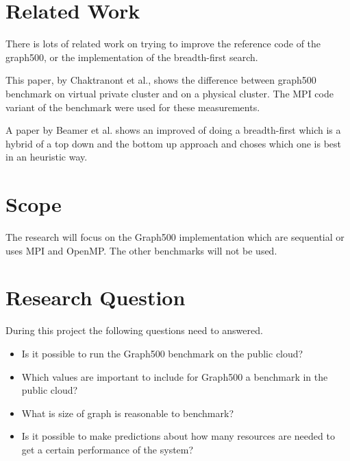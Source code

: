 \documentclass[A4]{scrartcl}
\begin{document}



\section*{Related Work}
There is lots of related work on trying to improve the reference code of the graph500, or the implementation of the breadth-first search. 

This paper, by Chaktranont et al.\cite{chakthranont2014exploring}, shows the difference between graph500 benchmark on virtual private cluster and on a physical cluster. The MPI code variant of the benchmark were used for these measurements.

A paper by Beamer et al.\cite{beamer2011searching} shows an improved of doing a breadth-first which is a hybrid of a top down and the bottom up approach and choses which one is best in an heuristic way. 



\section*{Scope}
The research will focus on the Graph500 implementation which are sequential or uses MPI and OpenMP. The other benchmarks will not be used. 

\section*{Research Question}
During this project the following questions need to answered.
\begin{itemize}
\item Is it possible to run the Graph500 benchmark on the public cloud?
\item Which values are important to include for Graph500 a benchmark in the public cloud?
\item What is size of graph is reasonable to benchmark?
\item Is it possible to make predictions about how many resources are needed to get a certain performance of the system?
\end{itemize}
\end{document}
